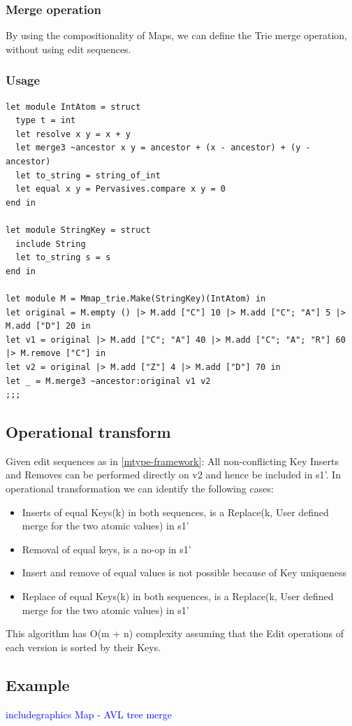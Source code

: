 \documentclass{article}
\newcommand{\mytodo}[1]{\textcolor{blue}{#1}}
\begin{document}
\subsubsection{Merge operation}
By using the compositionality of Maps, we can define the Trie merge operation, without using edit sequences.

\subsubsection{Usage}
\begin{lstlisting}
let module IntAtom = struct
  type t = int
  let resolve x y = x + y
  let merge3 ~ancestor x y = ancestor + (x - ancestor) + (y - ancestor)
  let to_string = string_of_int
  let equal x y = Pervasives.compare x y = 0 
end in

let module StringKey = struct
  include String
  let to_string s = s 
end in

let module M = Mmap_trie.Make(StringKey)(IntAtom) in
let original = M.empty () |> M.add ["C"] 10 |> M.add ["C"; "A"] 5 |> M.add ["D"] 20 in
let v1 = original |> M.add ["C"; "A"] 40 |> M.add ["C"; "A"; "R"] 60 |> M.remove ["C"] in
let v2 = original |> M.add ["Z"] 4 |> M.add ["D"] 70 in
let _ = M.merge3 ~ancestor:original v1 v2
;;;
\end{lstlisting}

\subsection{Operational transform}
Given edit sequences as in \ref{mtype-framework}: 
All non-conflicting Key Inserts and Removes can be performed directly on v2 and hence be included in s1'. In operational transformation we can identify the following cases:
\begin{itemize}
\item Inserts of equal Keys(k) in both sequences, is a Replace(k, User defined merge for the two atomic values) in s1'
\item Removal of equal keys, is a no-op in s1'
\item Insert and remove of equal values is not possible because of Key uniqueness
\item Replace of equal Keys(k) in both sequences, is a Replace(k, User defined merge for the two atomic values) in s1'
\end{itemize}
This algorithm has O(m + n) complexity assuming that the Edit operations of each version is sorted by their Keys.
\subsection{Example}
\mytodo{includegraphics Map - AVL tree merge}
\end{document}
